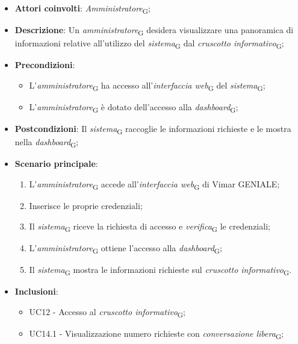 \begin{itemize}
    \item \textbf{Attori coinvolti}: \textit{Amministratore}\textsubscript{G};
    \item \textbf{Descrizione}: Un \textit{amministratore}\textsubscript{G} desidera visualizzare una panoramica di informazioni relative all’utilizzo del \textit{sistema}\textsubscript{G} dal \textit{cruscotto informativo}\textsubscript{G};
    \item \textbf{Precondizioni}: 
        \begin{itemize}
            \item L’\textit{amministratore}\textsubscript{G} ha accesso all’\textit{interfaccia web}\textsubscript{G} del \textit{sistema}\textsubscript{G};
            \item L’\textit{amministratore}\textsubscript{G} è dotato dell’accesso alla \textit{dashboard}\textsubscript{G};
        \end{itemize}
    \item \textbf{Postcondizioni}: Il \textit{sistema}\textsubscript{G} raccoglie le informazioni richieste e le mostra nella \textit{dashboard}\textsubscript{G};
    \item \textbf{Scenario principale}:
    \begin{enumerate}
    \item L’\textit{amministratore}\textsubscript{G} accede all’\textit{interfaccia web}\textsubscript{G} di Vimar GENIALE;
    \item Inserisce le proprie credenziali;
    \item Il \textit{sistema}\textsubscript{G} riceve la richiesta di accesso e \textit{verifica}\textsubscript{G} le credenziali;
    \item L’\textit{amministratore}\textsubscript{G} ottiene l’accesso alla \textit{dashboard}\textsubscript{G};
    \item Il \textit{sistema}\textsubscript{G} mostra le informazioni richieste sul \textit{cruscotto informativo}\textsubscript{G}.
    \end{enumerate}
    \item \textbf{Inclusioni}: 
    \begin{itemize}
        \item UC12 - Accesso al \textit{cruscotto informativo}\textsubscript{G};
        \item UC14.1 - Visualizzazione numero richieste con \textit{conversazione libera}\textsubscript{G};

\end{itemize}
\end{itemize}
